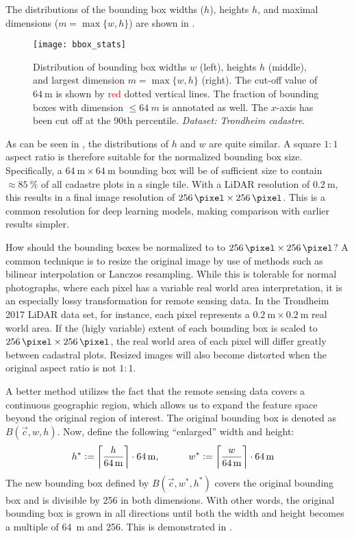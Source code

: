 The distributions of the bounding box widths ($h$), heights $h$, and maximal dimensions ($m = \max \{w, h\}$) are shown in .

\begin{figure}[htb]
  \texttt{[image: bbox\_stats]}
  \caption{
    Distribution of bounding box widths $w$ (left), heights $h$ (middle), and largest dimension $m = \max \{w, h\}$ (right).
    The cut-off value of $\SI{64}{\meter}$ is shown by \textcolor{red}{red} dotted vertical lines.
    The fraction of bounding boxes with dimension $\leq \SI{64}{m}$ is annotated as well.
    The $x$-axis has been cut off at the 90th percentile.
    \textit{Dataset: Trondheim cadastre}.
  }
  \label{fig:bbox-stats}
\end{figure}

As can be seen in , the distributions of $h$ and $w$ are quite similar.
A square $1:1$ aspect ratio is therefore suitable for the normalized bounding box size.
Specifically, a $\SI{64}{\meter} \times \SI{64}{\meter}$ bounding box will be of sufficient size to contain $\approx \SI{85}{\percent}$ of all cadastre plots in a single tile.
With a LiDAR resolution of $\SI{0.2}{\meter}$, this results in a final image resolution of $\SI{256}{\pixel} \times \SI{256}{\pixel}$.
This is a common resolution for deep learning models, making comparison with earlier results simpler.

How should the bounding boxes be normalized to to $\SI{256}{\pixel} \times \SI{256}{\pixel}$?
A common technique is to resize the original image by use of methods such as bilinear interpolation or Lanczos resampling.
While this is tolerable for normal photographs, where each pixel has a variable real world area interpretation, it is an especially lossy transformation for remote sensing data.
In the Trondheim 2017 LiDAR data set, for instance, each pixel represents a $\SI{0.2}{\meter} \times \SI{0.2}{\meter}$ real world area.
If the (higly variable) extent of each bounding box is scaled to $\SI{256}{\pixel} \times \SI{256}{\pixel}$, the real world area of each pixel will differ greatly between cadastral plots.
Resized images will also become distorted when the original aspect ratio is not $1:1$.

A better method utilizes the fact that the remote sensing data covers a continuous geographic region, which allows us to expand the feature space beyond the original region of interest.
The original bounding box is denoted as $B(\vec{c}, w, h)$.
Now, define the following \enquote{enlarged} width and height:
%
\begin{align*}
  h^* &:= \left\lceil \frac{h}{\SI{64}{\meter}} \right\rceil \cdot \SI{64}{\meter},
  \hspace{3em}
  w^* := \left\lceil \frac{w}{\SI{64}{\meter}} \right\rceil \cdot \SI{64}{\meter}
\end{align*}
%
The new bounding box defined by $B(\vec{c}, w^*, h^*)$ covers the original bounding box and is divisible by \SI{256}{\pixel} in both dimensions.
With other words, the original bounding box is grown in all directions until both the width and height becomes a multiple of \SI{64}{\meter} and \SI{256}{\pixel}.
This is demonstrated in .

